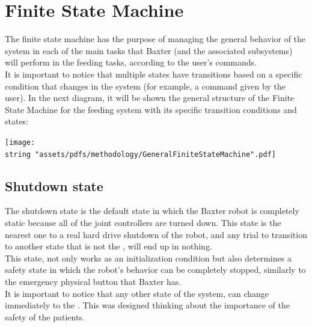 \documentclass[11pt]{report} %
\begin{document}
\section{Finite State Machine} \label{cite_finite_state_machine_section}

The finite state machine has the purpose of managing the general behavior of the system in each of the main tasks that Baxter (and the associated subsystems) will perform in the feeding tasks, according to the user's commands.\\

It is important to notice that multiple states have transitions based on a specific condition that changes in the system (for example, a command given by the user). In the next diagram, it will be shown the general structure of the Finite State Machine for the feeding system with its specific transition conditions and states:\\


\begin{center}
\texttt{[image: \\string "assets/pdfs/methodology/GeneralFiniteStateMachine".pdf]}
\bigbreak
\begin{minipage}{\linewidth} %
\label{fig_general_finite_machine}
\end{minipage} \end{center}

\subsection{Shutdown state}

The shutdown state is the default state in which the Baxter robot is completely static because all of the joint controllers are turned down. This state is the nearest one to a real hard drive shutdown of the robot, and any trial to transition to another state that is not the , will end up in nothing.\\

This state, not only works as an initialization condition but also determines a safety state in which the robot's behavior can be completely stopped, similarly to the emergency physical button that Baxter has.\\

It is important to notice that any other state of the system, can change immediately to the . This was designed thinking about the importance of the safety of the patients.\\
\end{document}
